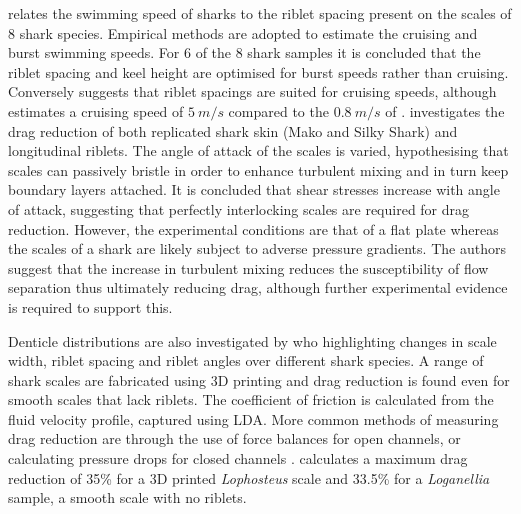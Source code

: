 \documentclass[12pt,oneside,a4paper]{article}
\begin{document}
 \cite{raschi1986} relates the swimming speed of sharks to the riblet spacing present on the scales of 8 shark species. Empirical methods are adopted to estimate the cruising and burst swimming speeds. For 6 of the 8 shark samples it is concluded that the riblet spacing and keel height are optimised for burst speeds rather than cruising. Conversely \cite{bechert1985} suggests that riblet spacings are suited for cruising speeds, although estimates a cruising speed of $5\ m/s$ compared to the $0.8\ m/s$ of \cite{raschi1986}.  \cite{bechert1985} investigates the drag reduction of both replicated shark skin (Mako and Silky Shark) and longitudinal riblets. The angle of attack of the scales is varied, hypothesising that scales can passively bristle in order to enhance turbulent mixing and in turn keep boundary layers attached. It is concluded that shear stresses increase with angle of attack, suggesting that perfectly interlocking scales are required for drag reduction. However, the experimental conditions are that of a flat plate whereas the scales of a shark are likely subject to adverse pressure gradients. The authors suggest that the increase in turbulent mixing reduces the susceptibility of flow separation thus ultimately reducing drag, although further experimental evidence is required to support this. 

Denticle distributions are also investigated by \cite{fletcher2014phd} who highlighting changes in scale width, riblet spacing and riblet angles over different shark species. A range of shark scales are fabricated using 3D printing and drag reduction is found even for smooth scales that lack riblets. The coefficient of friction is calculated from the fluid velocity profile, captured using LDA. More common methods of measuring drag reduction are through the use of force balances for open channels, or calculating pressure drops for closed channels \citep{bixler2013review}. \cite{fletcher2014phd} calculates a maximum drag reduction of 35\% for a 3D printed \textit{Lophosteus} scale and 33.5\% for a \textit{Loganellia} sample, a smooth scale with no riblets.
\end{document}
